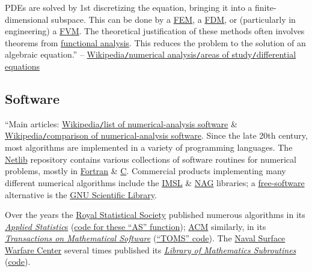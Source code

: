 \documentclass[oneside]{book}
\numberwithin{equation}{section}
\begin{document}
PDEs are solved by 1st discretizing the equation, bringing it into a finite-dimensional subspace. This can be done by a \href{https://en.wikipedia.org/wiki/Finite_element_method}{FEM}, a \href{https://en.wikipedia.org/wiki/Finite_difference}{FDM}, or (particularly in engineering) a \href{https://en.wikipedia.org/wiki/Finite_volume_method}{FVM}. The theoretical justification of these methods often involves theorems from \href{https://en.wikipedia.org/wiki/Functional_analysis}{functional analysis}. This reduces the problem to the solution of an algebraic equation.'' -- \href{https://en.wikipedia.org/wiki/Numerical_analysis#Differential_equations}{Wikipedia\texttt{/}numerical analysis\texttt{/}areas of study\texttt{/}differential equations}

\subsection{Software}
``Main articles: \href{https://en.wikipedia.org/wiki/List_of_numerical-analysis_software}{Wikipedia\texttt{/}list of numerical-analysis software} \& \href{https://en.wikipedia.org/wiki/Comparison_of_numerical-analysis_software}{Wikipedia\texttt{/}comparison of numerical-analysis software}. Since the late 20th century, most algorithms are implemented in a variety of programming languages. The \href{https://en.wikipedia.org/wiki/Netlib}{Netlib} repository contains various collections of software routines for numerical problems, mostly in \href{https://en.wikipedia.org/wiki/Fortran}{Fortran} \& \href{https://en.wikipedia.org/wiki/C_(programming_language)}{C}. Commercial products implementing many different numerical algorithms include the \href{https://en.wikipedia.org/wiki/IMSL_Numerical_Libraries}{IMSL} \& \href{https://en.wikipedia.org/wiki/Numerical_Algorithms_Group}{NAG} libraries; a \href{https://en.wikipedia.org/wiki/Free_software}{free-software} alternative is the \href{https://en.wikipedia.org/wiki/GNU_Scientific_Library}{GNU Scientific Library}.

Over the years the \href{https://en.wikipedia.org/wiki/Royal_Statistical_Society}{Royal Statistical Society} published numerous algorithms in its \href{https://en.wikipedia.org/wiki/Journal_of_the_Royal_Statistical_Society,_Series_C_(Applied_Statistics)}{\textit{Applied Statistic}s} (\href{https://jblevins.org/mirror/amiller/#apstat}{code for these ``AS'' function}); \href{https://en.wikipedia.org/wiki/Association_for_Computing_Machinery}{ACM} similarly, in its \href{https://en.wikipedia.org/wiki/Transactions_on_Mathematical_Software}{\textit{Transactions on Mathematical Software}} (\href{https://jblevins.org/mirror/amiller/#toms}{``TOMS'' code}). The \href{https://en.wikipedia.org/wiki/Naval_Surface_Warfare_Center}{Naval Surface Warfare Center} several times published its \href{https://web.archive.org/web/20201009001919/https://apps.dtic.mil/sti/pdfs/ADA476840.pdf}{\textit{Library of Mathematics Subroutines}} (\href{https://jblevins.org/mirror/amiller/#nswc}{code}).
\end{document}
